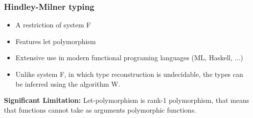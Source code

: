 \documentclass[xcolor=table]{beamer}
\begin{document}
\begin{frame}
\frametitle{Hindley-Milner typing}
\begin{block}
{ 
\begin{itemize}
	\item A restriction of system F	
	\item Features let polymorphism 
	\item Extensive use in modern functional programing languages (ML, Haskell, ...)
	\item Unlike system F, in which type reconstruction is undecidable, 
	         the types can be inferred using the algorithm W.
\end{itemize} \medskip
\textbf{Significant Limitation: }
Let-polymorphism is rank-1 polymorphism, that means that functions cannot take as arguments polymorphic functions.
}

\end{block}
\end{frame}
\end{document}
